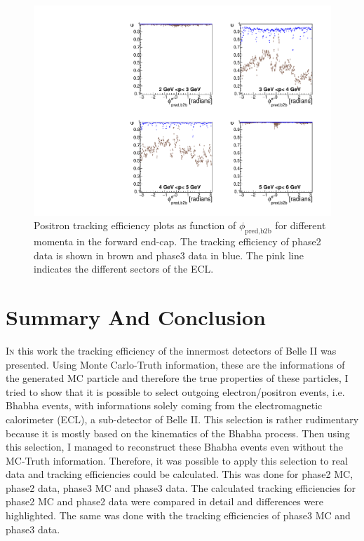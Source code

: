 \documentclass[a4paper,11pt,twosided,final,german,openbib,pdftex,listof=totoc,bibliography=totoc]{scrbook}
\begin{document}
\begin{figure}[!htbp]
	\centering
	\includegraphics[width=\textwidth]{Plots/comp/cMPhiepEC_Data.pdf}
	\caption[Momentum $\phi_{\textrm{pred,b2b}}$ Positron Efficiency Backward End-Cap Phase2 And Phase3 Data]{Positron tracking efficiency plots as function of $\phi_{\textrm{pred,b2b}}$ for different momenta in the forward end-cap. The tracking efficiency of phase2 data is shown in brown and phase3 data in blue. The pink line indicates the different sectors of the ECL.}
	\label{plt:compPhiemEC}
\end{figure}


\chapter{Summary And Conclusion}
\label{cha:Conclusion}

\lettrine{I}{n} this work the tracking efficiency of the innermost detectors of Belle II was presented. 
Using Monte Carlo-Truth information, these are the informations of the generated MC particle and therefore the true properties of these particles, I tried to show that it is possible to select outgoing electron/positron events, i.e. Bhabha events, with informations solely coming from the electromagnetic calorimeter (ECL), a sub-detector of Belle II. 
This selection is rather rudimentary because it is mostly based on the kinematics of the Bhabha process. Then using this selection, I managed to reconstruct these Bhabha events even without the MC-Truth information. Therefore, it was possible to apply this selection to real data and tracking efficiencies could be calculated. 
This was done for phase2 MC, phase2 data, phase3 MC and phase3 data.
The calculated tracking efficiencies for phase2 MC and phase2 data were compared in detail and differences were highlighted. The same was done with the tracking efficiencies of phase3 MC and phase3 data. 
\newline 
\end{document}
